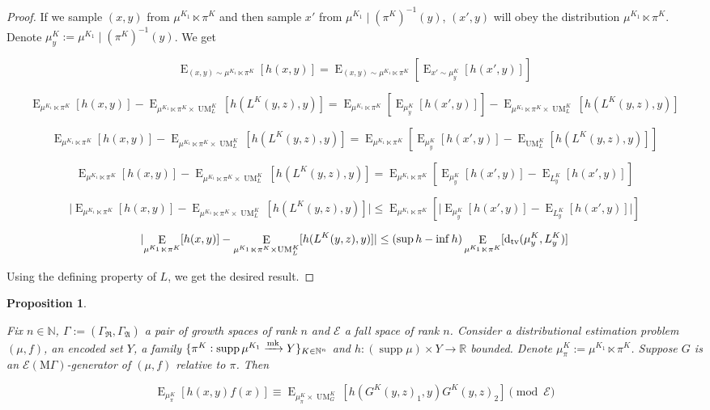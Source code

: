 \documentclass{article}
\numberwithin{equation}{section}
\theoremstyle{definition}
\theoremstyle{plain}
\newtheorem{proposition}{Proposition}[section]
\DeclareMathOperator{\Supp}{supp}
\DeclareMathOperator{\E}{E}
\DeclareMathOperator{\UM}{UM}
\newcommand{\Dtv}{\operatorname{d}_{\textnormal{tv}}}
\newcommand{\Nats}{\mathbb{N}}
\newcommand{\Reals}{\mathbb{R}}
\newcommand{\Abs}[1]{\lvert #1 \rvert}
\newcommand{\GrowR}{\Gamma_{\mathfrak{R}}}
\newcommand{\GrowA}{\Gamma_{\mathfrak{A}}}
\newcommand{\Grow}{\Gamma:=(\GrowR,\GrowA)}
\newcommand{\MGrow}{\mathrm{M}\Gamma}
\newcommand{\Fall}{\mathcal{E}}
\newcommand{\Markov}{\xrightarrow{\textnormal{mk}}}
\begin{document}
\begin{proof}

If we sample $(x,y)$ from $\mu^{K_1} \ltimes \pi^K$ and then sample $x'$ from ${\mu^{K_1} \mid (\pi^K)^{-1}(y)}$, $(x',y)$ will obey the distribution $\mu^{K_1} \ltimes \pi^K$. Denote $\mu_y^K:=\mu^{K_1} \mid (\pi^K)^{-1}(y)$. We get

$$\E_{(x,y) \sim \mu^{K_1} \ltimes \pi^K}[h(x,y)] = \E_{(x,y) \sim \mu^{K_1} \ltimes \pi^K}[\E_{x' \sim \mu_y^K}[h(x',y)]]$$

$$\E_{\mu^{K_1} \ltimes \pi^K}[h(x,y)] - \E_{\mu^{K_1} \ltimes \pi^K \times \UM_L^K}[h(L^K(y,z),y)] = \E_{\mu^{K_1} \ltimes \pi^K}[\E_{\mu_y^K}[h(x',y)]] - \E_{\mu^{K_1} \ltimes \pi^K \times \UM_L^K}[h(L^K(y,z),y)]$$

$$\E_{\mu^{K_1} \ltimes \pi^K}[h(x,y)] - \E_{\mu^{K_1} \ltimes \pi^K \times \UM_L^K}[h(L^K(y,z),y)] = \E_{\mu^{K_1} \ltimes \pi^K}[\E_{\mu_y^K}[h(x',y)]-\E_{\UM_L^K}[h(L^K(y,z),y)]]$$

$$\E_{\mu^{K_1} \ltimes \pi^K}[h(x,y)] - \E_{\mu^{K_1} \ltimes \pi^K \times \UM_L^K}[h(L^K(y,z),y)] = \E_{\mu^{K_1} \ltimes \pi^K}[\E_{\mu_y^K}[h(x',y)]-\E_{L_y^K}[h(x',y)]]$$

$$\Abs{\E_{\mu^{K_1} \ltimes \pi^K}[h(x,y)] - \E_{\mu^{K_1} \ltimes \pi^K \times \UM_L^K}[h(L^K(y,z),y)]} \leq \E_{\mu^{K_1} \ltimes \pi^K}[\Abs{\E_{\mu_y^K}[h(x',y)]-\E_{L_y^K}[h(x',y)]}]$$

$$\Abs{\E_{\mu^{K_1} \ltimes \pi^K}[h(x,y)] - \E_{\mu^{K_1} \ltimes \pi^K \times \UM_L^K}[h(L^K(y,z),y)]} \leq (\sup h - \inf h) \E_{\mu^{K_1} \ltimes \pi^K}[\Dtv(\mu_y^K,L_y^K)]$$

Using the defining property of $L$, we get the desired result.

\end{proof}

\begin{proposition}
\label{prp:gen}

Fix $n \in \Nats$, $\Grow$ a pair of growth spaces of rank $n$ and $\Fall$ a fall space of rank $n$. Consider a distributional estimation problem $(\mu,f)$, an encoded set $Y$, a family $\{\pi^K: \Supp \mu^{K_1} \Markov Y\}_{K \in \Nats^n}$ and ${h: (\Supp \mu) \times Y \rightarrow \Reals}$ bounded. Denote $\mu_\pi^K:=\mu^{K_1} \ltimes \pi^K$. Suppose $G$ is an $\Fall(\MGrow)$-generator of $(\mu,f)$ relative to $\pi$. Then

\begin{equation}
\E_{\mu_\pi^K}[h(x,y)f(x)] \equiv \E_{\mu_\pi^K \times \UM_G^K}[h(G^K(y,z)_1,y)G^K(y,z)_2] \pmod \Fall
\end{equation}

\end{proposition}
\end{document}
